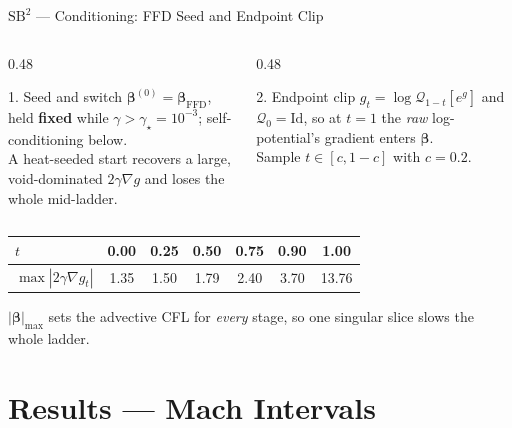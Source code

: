 \documentclass[aspectratio=169]{beamer}
\newcommand{\grad}{\nabla}
\newcommand{\Qcal}{\mathcal{Q}}
\begin{document}
\begin{frame}{$\mathrm{SB}^2$ — Conditioning: FFD Seed and Endpoint Clip}

\begin{columns}[T]
\begin{column}{0.48\textwidth}
\begin{block}{1. Seed and switch}
$\boldsymbol{\beta}^{(0)}=\boldsymbol{\beta}_{\mathrm{FFD}}$, held \textbf{fixed}
while $\gamma>\gamma_\star=10^{-3}$; self-conditioning below.\\[3pt]
{\small A heat-seeded start recovers a large, void-dominated $2\gamma\grad g$ and
loses the whole mid-ladder.}
\end{block}
\end{column}
\begin{column}{0.48\textwidth}
\begin{block}{2. Endpoint clip}
$g_t=\log\Qcal_{1-t}[e^{g}]$ and $\Qcal_0=\mathrm{Id}$, so at $t=1$ the
\emph{raw} log-potential's gradient enters $\boldsymbol{\beta}$.\\[3pt]
{\small Sample $t\in[c,1-c]$ with $c=0.2$.}
\end{block}
\end{column}
\end{columns}

\vspace{0.6em}
\centering
\begin{tabular}{lcccccc}
\toprule
$t$ & 0.00 & 0.25 & 0.50 & 0.75 & 0.90 & 1.00\\
\midrule
$\max|2\gamma\grad g_t|$ & 1.35 & 1.50 & 1.79 & 2.40 & 3.70 & \alert{13.76}\\
\bottomrule
\end{tabular}

\vspace{0.4em}
{\small $|\boldsymbol{\beta}|_{\max}$ sets the advective CFL for \emph{every}
stage, so one singular slice slows the whole ladder.}

\end{frame}


\section{Results — Mach Intervals}
\end{document}
